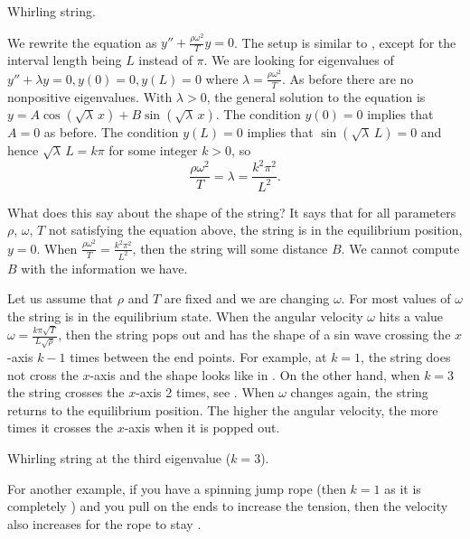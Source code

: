 \begin{myfig}
\capstart
{}
\caption{Whirling string.\label{bvp:whirstringfig}}
\end{myfig}

We rewrite the equation as
$y'' + \frac{\rho \omega^2}{T} y = 0$.
The setup is similar to , except for the
interval length being $L$ instead of $\pi$.  We are looking for eigenvalues
of $y'' + \lambda y = 0, y(0) = 0, y(L) = 0$ where
$\lambda = \frac{\rho \omega^2}{T}$.  As before
there are no nonpositive eigenvalues.  With $\lambda > 0$,
the general solution to the equation is $y = A \cos (  \sqrt{\lambda} \,x ) + B
\sin ( \sqrt{\lambda} \,x )$.  The condition $y(0) = 0$ implies that $A = 0$ as
before.  The condition $y(L) = 0$ implies that
$\sin ( \sqrt{\lambda} \, L) = 0$ and hence
$\sqrt{\lambda} \, L = k \pi$  for some integer $k > 0$, so
\begin{equation*}
\frac{\rho \omega^2}{T} = \lambda = \frac{k^2 \pi^2}{L^2} .
\end{equation*}

What does this say about the shape of the string?  It says that for
all parameters $\rho$, $\omega$, $T$ not satisfying the equation above, the
string is in the equilibrium position, $y=0$.  When 
$\frac{\rho \omega^2}{T} = \frac{k^2 \pi^2}{L^2}$, then the string will
 some distance $B$.  We cannot compute $B$
with the information we have.

Let us assume that $\rho$ and $T$ are fixed and we are changing $\omega$.
For most values of $\omega$ the string is in the equilibrium state.  When 
the angular velocity $\omega$ hits a value
$\omega = \frac{k \pi \sqrt{T}}{L\sqrt{\rho}}$, then the string 
pops out and has the shape of a sin wave crossing the
$x$-axis $k-1$ times between the end points.
For example, at $k=1$, the string does not cross the $x$-axis
and the shape looks like in .
On the other hand, when $k=3$ the string crosses the $x$-axis
2 times, see .
When $\omega$ changes again, the string returns to
the equilibrium position.  The higher the angular velocity,
the more times it crosses the $x$-axis when it is popped out.

\begin{myfig}
\capstart
{}
\caption{Whirling string at the third eigenvalue ($k=3$).\label{bvp:whirstring2fig}}
\end{myfig}

For another example, if you have a spinning jump rope (then $k=1$ as it is
completely ) and you
pull on the ends to increase the tension, then the velocity also increases
for the rope to stay .


